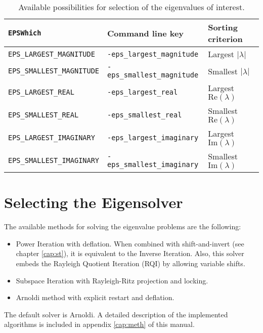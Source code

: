 \begin{table}[t]
\centering
{\small \begin{tabular}{lll}
\texttt{EPSWhich}                  & Command line key                   & Sorting criterion \\\hline
\texttt{EPS\_LARGEST\_MAGNITUDE}   & \texttt{-eps\_largest\_magnitude}  & Largest $|\lambda|$ \\
\texttt{EPS\_SMALLEST\_MAGNITUDE}  & \texttt{-eps\_smallest\_magnitude} & Smallest $|\lambda|$ \\
\texttt{EPS\_LARGEST\_REAL}        & \texttt{-eps\_largest\_real}       & Largest $\mathrm{Re}(\lambda)$ \\
\texttt{EPS\_SMALLEST\_REAL}       & \texttt{-eps\_smallest\_real}      & Smallest $\mathrm{Re}(\lambda)$ \\
\texttt{EPS\_LARGEST\_IMAGINARY}   & \texttt{-eps\_largest\_imaginary}  & Largest $\mathrm{Im}(\lambda)$\footnotemark \\
\texttt{EPS\_SMALLEST\_IMAGINARY}  & \texttt{-eps\_smallest\_imaginary} & Smallest $\mathrm{Im}(\lambda)$\addtocounter{footnote}{-1}\footnotemark \\\hline
\end{tabular} }
\caption{\label{tab:portion}Available possibilities for selection of the eigenvalues of interest.}
\end{table}


\section{Selecting the Eigensolver}

	The available methods for solving the eigenvalue problems are the following:
\begin{itemize}
\item Power Iteration with deflation. When combined with shift-and-invert (see chapter \ref{cap:st}), it is equivalent to the Inverse Iteration. Also, this solver embeds the Rayleigh Quotient Iteration (RQI) by allowing variable shifts.
\item Subspace Iteration with Rayleigh-Ritz projection and locking.
\item Arnoldi method with explicit restart and deflation.
\end{itemize}
The default solver is Arnoldi. A detailed description of the implemented algorithms is included in appendix \ref{cap:meth} of this manual.

